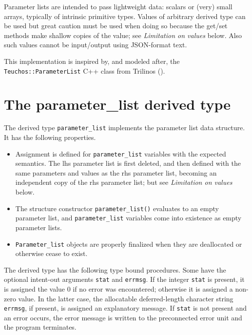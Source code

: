 \documentclass[11pt]{article}
\begin{document}
Parameter lists are intended to pass lightweight data: scalars or (very)
small arrays, typically of intrinsic primitive types.  Values of arbitrary
derived type can be used but great caution must be used when doing so
because the get/set methods make shallow copies of the value; see
\emph{Limitation on values} below.  Also such values cannot be input/output
using JSON-format text.

This implementation is inspired by, and modeled after, the
\texttt{Teuchos::ParameterList} C++ class from Trilinos
().

\section{The parameter_list derived type}
The derived type \texttt{parameter_list} implements the parameter list data
structure.  It has the following properties.
\begin{itemize}
\item
  Assignment is defined for \texttt{parameter_list} variables with the
  expected semantics.  The lhs parameter list is first deleted, and then
  defined with the same parameters and values as the rhs parameter list,
  becoming an independent copy of the rhs parameter list; but see
  \emph{Limitation on values} below.
\item
  The structure constructor \texttt{parameter_list()} evaluates to an
  empty parameter list, and \texttt{parameter_list} variables come into
  existence as empty parameter lists.
\item
  \texttt{Parameter_list} objects are properly finalized when they are
  deallocated or otherwise cease to exist.
\end{itemize}

The derived type has the following type bound procedures.  Some have the
optional intent-out arguments \texttt{stat} and \texttt{errmsg}.  If the
integer \texttt{stat} is present, it is assigned the value 0 if no error
was encountered; otherwise it is assigned a non-zero value.  In the latter
case, the allocatable deferred-length character string \texttt{errmsg},
if present, is assigned an explanatory message.  If \texttt{stat} is not
present and an error occurs, the error message is written to the preconnected
error unit and the program terminates.
\end{document}
